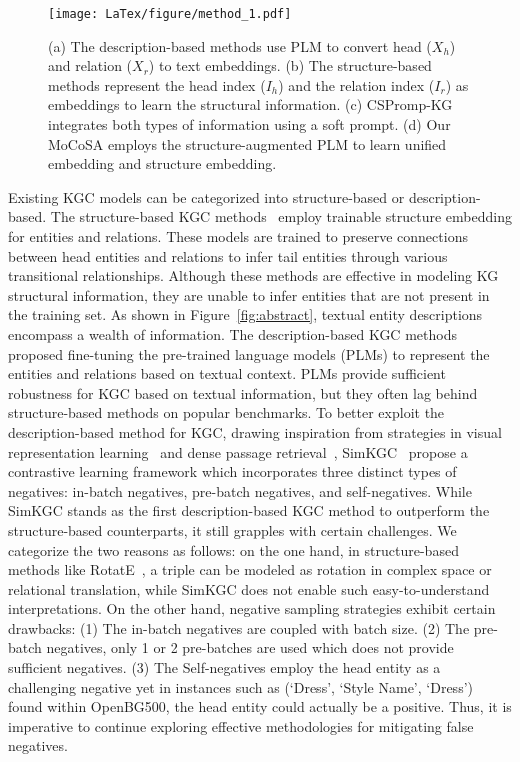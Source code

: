 \documentclass[11pt]{article}
\begin{document}
\begin{figure*}[!htb]
  \centering
\texttt{[image: LaTex/figure/method\_1.pdf]}
\caption{(a) The description-based methods use PLM to convert head ($X_{h}$) and relation ($X_{r}$) to text embeddings. (b) The structure-based methods represent the head index ($I_{h}$) and the relation index ($I_{r}$) as embeddings to learn the structural information.
(c) CSPromp-KG~\cite{Chen2023DippingPS} integrates both types of information using a soft prompt.
(d) Our MoCoSA employs the structure-augmented PLM to learn unified embedding and structure embedding.
  }
\label{fig:method_1}
\vspace{-10pt}
\end{figure*}

Existing KGC models can be categorized into structure-based or description-based. The structure-based KGC methods~\cite{bordes2013translating, trouillon2016complex} employ trainable structure embedding for entities and relations. These models are trained to preserve connections between head entities and relations to infer tail entities through various transitional relationships. Although these methods are effective in modeling KG structural information, 
they are unable to infer entities that are not present in the training set. As shown in Figure~\ref{fig:abstract}, textual entity descriptions encompass a wealth of information. The description-based KGC methods~\cite{Choi2021MEMKGCME, yao2019kg, Wang2022LanguageMA} proposed fine-tuning the pre-trained language models (PLMs) to represent the entities and relations based on textual context. PLMs provide sufficient robustness for KGC based on textual information, but they often lag behind structure-based methods on popular benchmarks. To better exploit the description-based method for KGC, drawing inspiration from strategies in visual representation learning~\cite{Khosla2020SupervisedCL} and dense passage retrieval~\cite{Karpukhin2020DensePR}, SimKGC~\cite{Wang2022SimKGCSC} propose a contrastive learning framework
 which incorporates three distinct types of negatives: in-batch negatives, pre-batch negatives, and self-negatives. While SimKGC stands as the first description-based KGC method to outperform the structure-based counterparts, it still grapples with certain challenges. We categorize the two reasons as follows: on the one hand, in structure-based methods like RotatE~\cite{sun2018rotate}, a triple can be modeled as rotation in complex space or relational translation, while SimKGC
does not enable such easy-to-understand interpretations. On the other hand, negative sampling strategies exhibit certain drawbacks: (1) The in-batch negatives are coupled with batch size. (2) The pre-batch negatives, only 1 or 2 pre-batches are used which does not provide sufficient negatives. (3) The Self-negatives employ the head entity as a challenging negative yet in instances such as (`Dress', `Style Name', `Dress') found within OpenBG500, the head entity could actually be a positive. Thus, it is imperative to continue exploring effective methodologies for mitigating false negatives.
\end{document}
